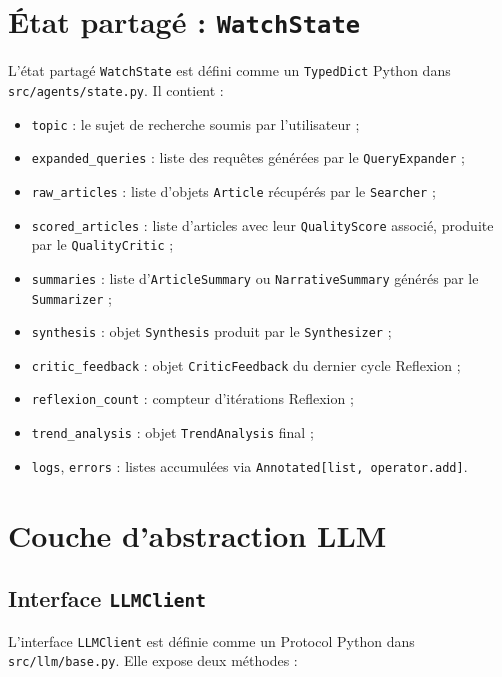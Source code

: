 \section{État partagé : \texttt{WatchState}}

L'état partagé \texttt{WatchState} est défini comme un \texttt{TypedDict}
Python dans \texttt{src/agents/state.py}. Il contient :

\begin{itemize}
  \item \texttt{topic} : le sujet de recherche soumis par l'utilisateur ;
  \item \texttt{expanded\_queries} : liste des requêtes générées par
    le \texttt{QueryExpander} ;
  \item \texttt{raw\_articles} : liste d'objets \texttt{Article} récupérés
    par le \texttt{Searcher} ;
  \item \texttt{scored\_articles} : liste d'articles avec leur
    \texttt{QualityScore} associé, produite par le \texttt{QualityCritic} ;
  \item \texttt{summaries} : liste d'\texttt{ArticleSummary} ou
    \texttt{NarrativeSummary} générés par le \texttt{Summarizer} ;
  \item \texttt{synthesis} : objet \texttt{Synthesis} produit par
    le \texttt{Synthesizer} ;
  \item \texttt{critic\_feedback} : objet \texttt{CriticFeedback}
    du dernier cycle Reflexion ;
  \item \texttt{reflexion\_count} : compteur d'itérations Reflexion ;
  \item \texttt{trend\_analysis} : objet \texttt{TrendAnalysis} final ;
  \item \texttt{logs}, \texttt{errors} : listes accumulées via
    \texttt{Annotated[list, operator.add]}.
\end{itemize}

\section{Couche d'abstraction LLM}

\subsection{Interface \texttt{LLMClient}}

L'interface \texttt{LLMClient} est définie comme un Protocol Python
dans \texttt{src/llm/base.py}. Elle expose deux méthodes :

